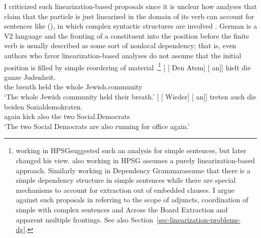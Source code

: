 \begin{exe}
\begin{xlist}[iv.]
\begin{exe}
\begin{xlist}[iv.]
I criticized such linearization-based proposals since it is unclear how
analyses that claim that the particle is just linearized in the domain of its verb can account for
sentences like (), in which complex syntactic structures are involved \citep{Mueller2007d}. German is a V2 language
and the fronting of a constituent into the position before the finite verb is usually described as
some sort of nonlocal dependency; that is, even authors who favor linearization-based analyses do
not assume that the initial position is filled by simple reordering of material
\citep{Kathol2000a,Mueller99a,Mueller2002b,TBjerre2006a}.\footnote{%
  \citet[Section~6.3]{Kathol95a} working in HPSG\indexhpsg suggested such an analysis for simple sentences, but later
  changed his view. \citet{Wetta2011a} also working in HPSG assumes a purely linearization-based
  approach. Similarly \citet{GO2009a} working in  Dependency Grammar\indexdg assume that there is a
  simple dependency structure in simple sentences while there are special mechanisms to account for
  extraction out of embedded clauses. I argue against such proposals in  referring
  to the scope of adjuncts, coordination of simple with complex sentences and Across the Board
  Extraction and apparent multiple frontings. See also Section~\ref{sec-linearization-problems-dg}.
}
\eal
\label{ex-complex-vf}
\ex
\gll {}[ [ Den Atem]  [ an]] hielt die ganze Judenheit.\footnotemark\\
       {}        {}        the breath {}    \partic{}  held  the whole Jewish.community\\
\glt `The whole Jewish community held their breath.'
\ex\label{bsp-wieder-an-tritt-zwei}
\gll {}[ [ Wieder] [ an]] treten auch die beiden Sozialdemokraten.\footnotemark\\
      {}         {}        again   {}        \partic{} kick also the two Social.Democrats\\
\glt `The two Social Democrats are also running for office again.' %


\end{xlist}
\end{exe}
\end{xlist}
\end{exe}

